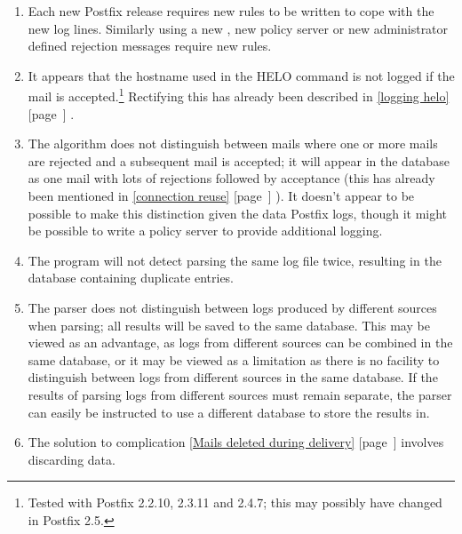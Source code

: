 \documentclass[a4paper,12pt,draft]{article}
\newcommand{\refwithpage}[1]{%
    \empty{}\ref{#1} [page~\pageref{#1}]%
}
\newcommand{\sectionref}[1]{%
    \textsection{}\refwithpage{#1}%
}
\begin{document}
\begin{enumerate}

    \item Each new Postfix release requires new rules to be written to cope
        with the new log lines.  Similarly using a new \RBL{}, new policy
        server or new administrator defined rejection messages require new
        rules.

    \item It appears that the hostname used in the HELO command is not
        logged if the mail is accepted.\footnote{Tested with Postfix
        2.2.10, 2.3.11 and 2.4.7; this may possibly have changed in Postfix
        2.5.}  Rectifying this has already been described in
        \sectionref{logging helo}.

    \item The algorithm does not distinguish between mails where one or
        more mails are rejected and a subsequent mail is accepted; it will
        appear in the database as one mail with lots of rejections followed
        by acceptance (this has already been mentioned in
        \sectionref{connection reuse}).  It doesn't appear to be possible
        to make this distinction given the data Postfix logs, though it
        might be possible to write a policy server to provide additional
        logging.

    \item The program will not detect parsing the same log file twice,
        resulting in the database containing duplicate entries.

    \item The parser does not distinguish between logs produced by
        different sources when parsing; all results will be saved to the
        same database.  This may be viewed as an advantage, as logs from
        different sources can be combined in the same database, or it may
        be viewed as a limitation as there is no facility to distinguish
        between logs from different sources in the same database.  If the
        results of parsing logs from different sources must remain
        separate, the parser can easily be instructed to use a different
        database to store the results in.

    \item The solution to complication \sectionref{Mails deleted during
        delivery} involves discarding data.

\end{enumerate}
\end{document}
